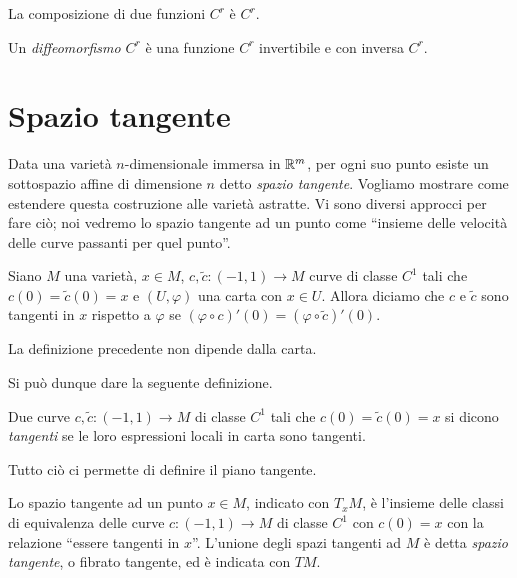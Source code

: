 \begin{proposition}
   La composizione di due funzioni $C^r$ è $C^r$.
 \end{proposition}
 
 \begin{definition} 
  Un \emph{diffeomorfismo $C^r$} è una funzione $C^r$ invertibile e con inversa $C^r$.
 \end{definition}
 
 \section{Spazio tangente}
 
 Data una varietà $n$-dimensionale immersa in $\mathbb R^m$, per ogni suo punto esiste
 un sottospazio affine di dimensione $n$ detto \emph{spazio tangente}. Vogliamo
 mostrare come estendere questa costruzione alle varietà astratte. Vi sono diversi
 approcci per fare ciò; noi vedremo lo spazio tangente ad un punto come ``insieme delle
 velocità delle curve passanti per quel punto''.
 
\begin{definition}
	Siano $M$ una varietà, $x\in M$, $c,\tilde{c}:(-1,1)\to M$ curve di classe $C^1$ tali che $c(0)=\tilde{c}(0)=x$ e $(U,\varphi)$ una carta con $x\in U$. Allora diciamo che $c$ e $\tilde{c}$ sono 	tangenti in $x$ rispetto a $\varphi$ se $(\varphi\circ c)'(0)=(\varphi\circ\tilde{c})'(0)$.
\end{definition}

\begin{proposition}
	La definizione precedente non dipende dalla carta.
\end{proposition}

Si può dunque dare la seguente definizione.
 
\begin{definition} 
	Due curve $c,\tilde{c}:(-1,1)\to M$ di classe $C^1$ tali che $c(0)=\tilde{c}(0)=x$ si dicono \emph{tangenti} se le loro espressioni locali in carta sono tangenti.
\end{definition}

Tutto ciò ci permette di definire il piano tangente.
 
\begin{definition}  
	Lo spazio tangente ad un punto $x\in M$, indicato con $T_xM$, è l'insieme delle classi di equivalenza delle curve $c:(-1,1)\to M$ di classe $C^1$ con $c(0)=x$ con la relazione ``essere tangenti in $x$''. L'unione degli spazi tangenti ad $M$ è detta \emph{spazio tangente}, o fibrato tangente, ed è indicata con $TM$.
\end{definition}
 
